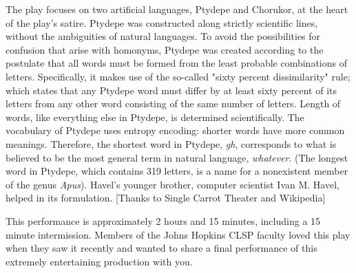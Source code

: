 The play focuses on two artificial languages, Ptydepe and Chorukor, at the heart of the play's satire. Ptydepe was constructed along strictly scientific lines, without the ambiguities of natural languages. To avoid the possibilities for confusion that arise with homonyms, Ptydepe was created according to the postulate that all words must be formed from the least probable combinations of letters. Specifically, it makes use of the so-called "sixty percent dissimilarity" rule; which states that any Ptydepe word must differ by at least sixty percent of its letters from any other word consisting of the same number of letters. Length of words, like everything else in Ptydepe, is determined scientifically. The vocabulary of Ptydepe uses entropy encoding: shorter words have more common meanings. Therefore, the shortest word in Ptydepe, {\it gh}, corresponds to what is believed to be the most general term in natural language, {\it whatever}. (The longest word in Ptydepe, which contains 319 letters, is a name for a nonexistent member of the genus {\it Apus}). Havel's younger brother, computer scientist Ivan M. Havel, helped in its formulation. [Thanks to Single Carrot Theater and Wikipedia]

This performance is approximately 2 hours and 15 minutes, including a
15 minute intermission.  Members of the Johns Hopkins CLSP faculty
loved this play when they saw it recently and wanted to share a final
performance of this extremely entertaining production with you.
